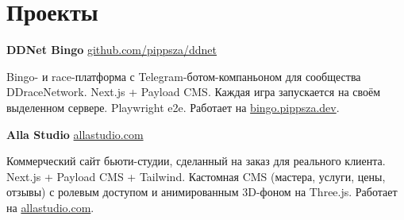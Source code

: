 \documentclass[11pt,a4paper]{article}
\newcommand{\sidebarwidth}{5.8cm}
\begin{document}
\begin{minipage}[t]{\dimexpr\paperwidth-\sidebarwidth\relax}
\begin{minipage}[t]{\dimexpr\paperwidth-\sidebarwidth-1.8cm\relax}
\section*{Проекты}

{\bfseries DDNet Bingo} \quad \href{https://github.com/pippsza/ddnet}{\color{accent}\small github.com/pippsza/ddnet}\par
\vspace{2pt}
Bingo- и race-платформа с Telegram-ботом-компаньоном для сообщества
DDraceNetwork. Next.js + Payload CMS. Каждая игра запускается на своём
выделенном сервере. Playwright e2e.
Работает на \href{https://bingo.pippsza.dev}{bingo.pippsza.dev}.

\vspace{6pt}
{\bfseries Alla Studio} \quad \href{https://allastudio.com}{\color{accent}\small allastudio.com}\par
\vspace{2pt}
Коммерческий сайт бьюти-студии, сделанный на заказ для реального клиента.
Next.js + Payload CMS + Tailwind. Кастомная CMS (мастера, услуги, цены,
отзывы) с ролевым доступом и анимированным 3D-фоном на Three.js. Работает
на \href{https://allastudio.com}{allastudio.com}.

\end{minipage}
\end{minipage}
\end{document}
